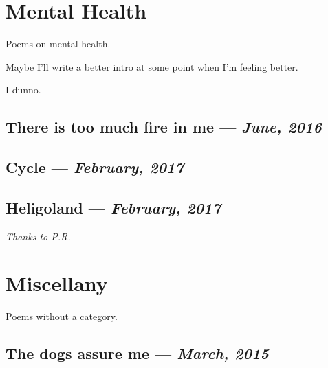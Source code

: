 \documentclass[10pt]{memoir}
\begin{document}

  \chapter{Mental Health}

  Poems on mental health.

  \vfill

  \noindent Maybe I'll write a better intro at some point when I'm feeling better.

  \vfill

  \hfill I dunno.
  \thispagestyle{empty}
  \newpage


  \section{There is too much fire in me --- \textit{June, 2016}}

  
  \newpage


  \section{Cycle --- \textit{February, 2017}}

  
  \newpage


  \section{Heligoland --- \textit{February, 2017}}

  

  \textit{Thanks to P.R.}
  \newpage


  \chapter{Miscellany}

  Poems without a category.
  \thispagestyle{empty}
  \newpage


  \section{The dogs assure me --- \textit{March, 2015}}

  
\end{document}
